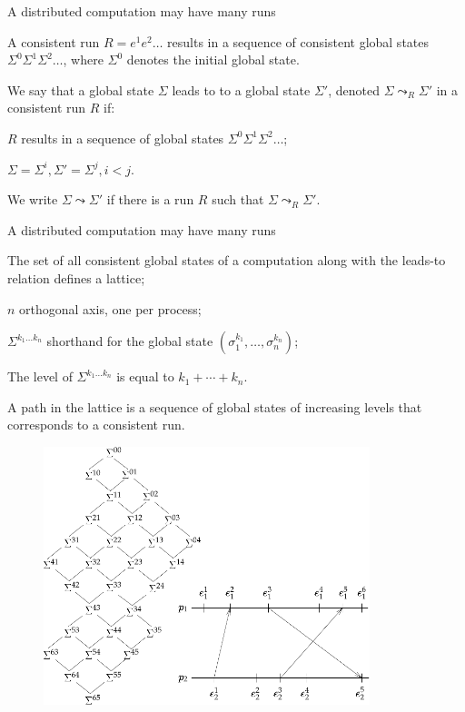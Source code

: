 \begin{frame}{A distributed computation may have many runs}

\begin{definition}
\BIL
\item A consistent run $R=e^1 e^2 \ldots$ results in a sequence of consistent global states
$\Sigma^0 \Sigma^1 \Sigma^2 \ldots$, where $\Sigma^0$ denotes the initial global state.
\item We say that a global state $\Sigma$ \alert{leads to} to a global state $\Sigma'$, denoted
  $\Sigma \leadsto_R \Sigma'$ in a consistent run $R$ if:
  \BI 
  \item $R$ results in a sequence of global states $\Sigma^0 \Sigma^1 \Sigma^2 \ldots$;
  \item $\Sigma = \Sigma^i, \Sigma' = \Sigma^j, i < j$.
  \EI
\item We write $\Sigma \leadsto \Sigma'$ if there is a run $R$ such that $\Sigma \leadsto_R \Sigma'$.
\EIL
\end{definition}

\end{frame}

\begin{frame}{A distributed computation may have many runs}
	
\begin{definition}[Lattice]
\BIL
\item The set of all consistent global states of a computation along with the leads-to relation
defines a \alert{lattice};
\item $n$ orthogonal axis, one per process;
\item $\Sigma^{k_1 \ldots k_n}$ shorthand for the global state $(\sigma_1^{k_1}, \ldots, \sigma_n^{k_n})$;
\item The \alert{level} of $\Sigma^{k_1 \ldots k_n}$ is equal to $k_1+ \cdots + k_n$.
\item A path in the lattice is a sequence of global states of increasing levels that corresponds
  to a consistent run.
\EIL
\end{definition}

\end{frame}

\begin{frame}
\begin{figure} 
\includegraphics[width=9.5cm]{figs/03/figure-3}
\end{figure}
\end{frame}


